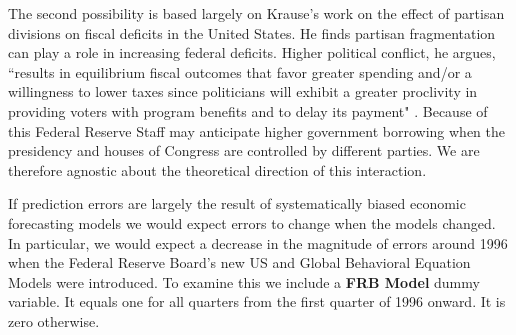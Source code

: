 \documentclass[a4paper]{article}\usepackage[]{graphicx}\usepackage[]{color}
\begin{document}
The second possibility is based largely on Krause's \citeyearpar{Krause2000} work on the effect of partisan divisions on fiscal deficits in the United States. He finds partisan fragmentation can play a role in increasing federal deficits. Higher political conflict, he argues, ``results in equilibrium fiscal outcomes that favor greater spending and/or a willingness to lower taxes since politicians will exhibit a greater proclivity in providing voters with program benefits and to delay its payment" \citep[][542]{Krause2000}. Because of this Federal Reserve Staff may anticipate higher government borrowing when the presidency and houses of Congress are controlled by different parties. We are therefore agnostic about the theoretical direction of this interaction.

If prediction errors are largely the result of systematically biased economic forecasting models we would expect errors to change when the models changed. In particular, we would expect a decrease in the magnitude of errors around 1996 when the Federal Reserve Board's new US and Global Behavioral Equation Models were introduced. To examine this we include a {\bf{FRB Model}} dummy variable. It equals one for all quarters from the first quarter of 1996 onward. It is zero otherwise.
\end{document}
